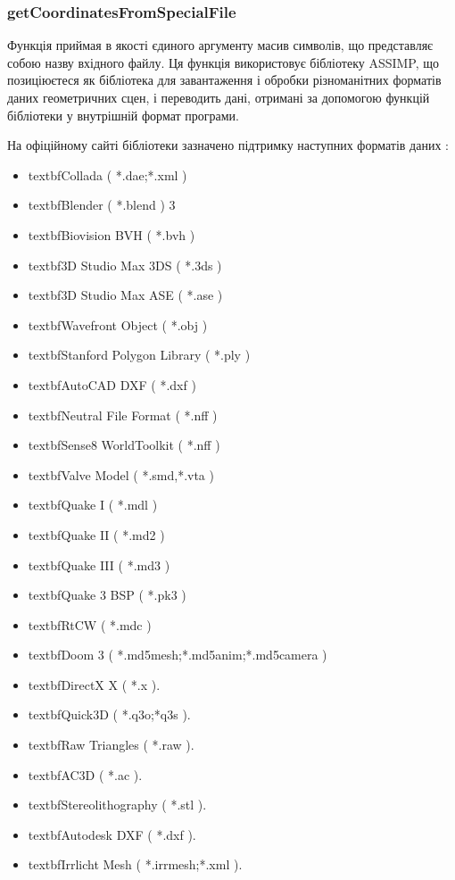 \documentclass[a4paper,12pt]{article}
\begin{document}
\subsubsection{getCoordinatesFromSpecialFile}
Функція приймая в якості єдиного аргументу масив символів, що представляє собою назву вхідного файлу. Ця функція використовує бібліотеку ASSIMP, що позиціюєтеся як бібліотека для завантаження і обробки різноманітних форматів даних геометричних сцен, і переводить дані, отримані за допомогою функцій бібліотеки у внутрішній формат програми.

На офіційному сайті бібліотеки зазначено підтримку наступних форматів даних \cite{assimp}:
\begin{itemize}
 \item textbf{Collada} ( *.dae;*.xml )
 \item textbf{Blender} ( *.blend ) 3
 \item textbf{Biovision BVH} ( *.bvh )
 \item textbf{3D Studio Max 3DS} ( *.3ds )
 \item textbf{3D Studio Max ASE} ( *.ase )
 \item textbf{Wavefront Object} ( *.obj )
 \item textbf{Stanford Polygon Library} ( *.ply )
 \item textbf{AutoCAD DXF} ( *.dxf )
 \item textbf{Neutral File Format} ( *.nff )
 \item textbf{Sense8 WorldToolkit} ( *.nff )
 \item textbf{Valve Model} ( *.smd,*.vta )
 \item textbf{Quake I} ( *.mdl )
 \item textbf{Quake II} ( *.md2 )
 \item textbf{Quake III} ( *.md3 )
 \item textbf{Quake 3 BSP} ( *.pk3 )
 \item textbf{RtCW} ( *.mdc )
 \item textbf{Doom 3} ( *.md5mesh;*.md5anim;*.md5camera )
 \item textbf{DirectX X} ( *.x ).
 \item textbf{Quick3D} ( *.q3o;*q3s ).
 \item textbf{Raw Triangles} ( *.raw ).
 \item textbf{AC3D} ( *.ac ).
 \item textbf{Stereolithography} ( *.stl ).
 \item textbf{Autodesk DXF} ( *.dxf ).
 \item textbf{Irrlicht Mesh} ( *.irrmesh;*.xml ).

\end{itemize}
\end{document}
